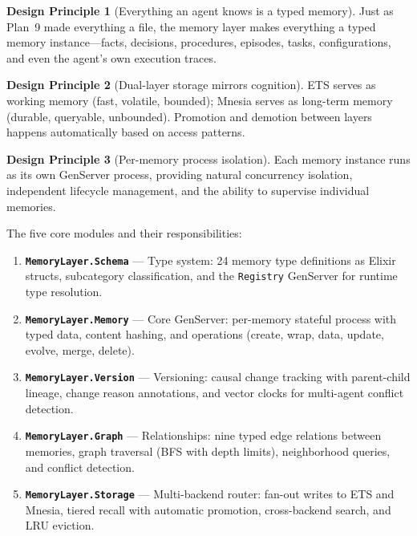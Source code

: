 \documentclass[12pt,a4paper]{article}
\theoremstyle{definition}
\newtheorem{designprinciple}{Design Principle}
\begin{document}
\begin{designprinciple}[Everything an agent knows is a typed memory]
Just as Plan~9 made everything a file, the memory layer makes everything a typed memory instance---facts, decisions, procedures, episodes, tasks, configurations, and even the agent's own execution traces.
\end{designprinciple}

\begin{designprinciple}[Dual-layer storage mirrors cognition]
ETS serves as working memory (fast, volatile, bounded); Mnesia serves as long-term memory (durable, queryable, unbounded).
Promotion and demotion between layers happens automatically based on access patterns.
\end{designprinciple}

\begin{designprinciple}[Per-memory process isolation]
Each memory instance runs as its own GenServer process, providing natural concurrency isolation, independent lifecycle management, and the ability to supervise individual memories.
\end{designprinciple}

The five core modules and their responsibilities:

\begin{enumerate}
  \item \textbf{\texttt{MemoryLayer.Schema}} --- Type system: 24 memory type definitions as Elixir structs, subcategory classification, and the \texttt{Registry} GenServer for runtime type resolution.
  \item \textbf{\texttt{MemoryLayer.Memory}} --- Core GenServer: per-memory stateful process with typed data, content hashing, and operations (create, wrap, data, update, evolve, merge, delete).
  \item \textbf{\texttt{MemoryLayer.Version}} --- Versioning: causal change tracking with parent-child lineage, change reason annotations, and vector clocks for multi-agent conflict detection.
  \item \textbf{\texttt{MemoryLayer.Graph}} --- Relationships: nine typed edge relations between memories, graph traversal (BFS with depth limits), neighborhood queries, and conflict detection.
  \item \textbf{\texttt{MemoryLayer.Storage}} --- Multi-backend router: fan-out writes to ETS and Mnesia, tiered recall with automatic promotion, cross-backend search, and LRU eviction.
\end{enumerate}
\end{document}
